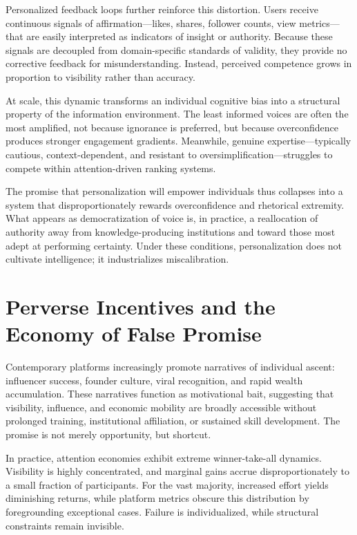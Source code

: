 \documentclass[12pt]{article}
\begin{document}
Personalized feedback loops further reinforce this distortion. Users receive continuous signals of affirmation—likes, shares, follower counts, view metrics—that are easily interpreted as indicators of insight or authority. Because these signals are decoupled from domain-specific standards of validity, they provide no corrective feedback for misunderstanding. Instead, perceived competence grows in proportion to visibility rather than accuracy.

At scale, this dynamic transforms an individual cognitive bias into a structural property of the information environment. The least informed voices are often the most amplified, not because ignorance is preferred, but because overconfidence produces stronger engagement gradients. Meanwhile, genuine expertise—typically cautious, context-dependent, and resistant to oversimplification—struggles to compete within attention-driven ranking systems.

The promise that personalization will empower individuals thus collapses into a system that disproportionately rewards overconfidence and rhetorical extremity. What appears as democratization of voice is, in practice, a reallocation of authority away from knowledge-producing institutions and toward those most adept at performing certainty. Under these conditions, personalization does not cultivate intelligence; it industrializes miscalibration.

\section{Perverse Incentives and the Economy of False Promise}

Contemporary platforms increasingly promote narratives of individual ascent: influencer success, founder culture, viral recognition, and rapid wealth accumulation. These narratives function as motivational bait, suggesting that visibility, influence, and economic mobility are broadly accessible without prolonged training, institutional affiliation, or sustained skill development. The promise is not merely opportunity, but shortcut.

In practice, attention economies exhibit extreme winner-take-all dynamics. Visibility is highly concentrated, and marginal gains accrue disproportionately to a small fraction of participants. For the vast majority, increased effort yields diminishing returns, while platform metrics obscure this distribution by foregrounding exceptional cases. Failure is individualized, while structural constraints remain invisible.
\end{document}
